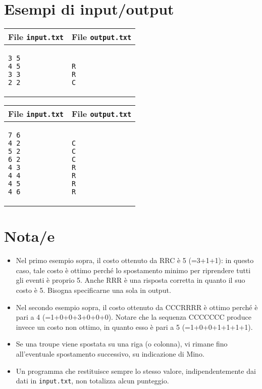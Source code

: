 \documentclass[a4paper,11pt]{article}
\begin{document}
\section*{Esempi di input/output}

  
    \noindent
    \begin{tabular}{p{11cm}|p{5cm}}
    \toprule
    \textbf{File \texttt{input.txt}}
    & \textbf{File \texttt{output.txt}}
    \\
    \midrule
    \scriptsize
    \begin{verbatim}
3 5
4 5 
3 3
2 2
\end{verbatim}
    &
    \scriptsize
    \begin{verbatim}

R
R
C
\end{verbatim}
    \\
    \bottomrule
    \end{tabular}
  
    \noindent
    \begin{tabular}{p{11cm}|p{5cm}}
    \toprule
    \textbf{File \texttt{input.txt}}
    & \textbf{File \texttt{output.txt}}
    \\
    \midrule
    \scriptsize
    \begin{verbatim}
7 6
4 2
5 2
6 2
4 3
4 4
4 5
4 6
\end{verbatim}
    &
    \scriptsize
    \begin{verbatim}

C
C
C
R
R
R
R
\end{verbatim}
    \\
    \bottomrule
    \end{tabular}
  
\section*{Nota/e}
\begin{itemize}
  
    \item 
Nel primo esempio sopra, il costo ottenuto da RRC è 5 (=3+1+1):
in questo caso, tale costo è ottimo perché lo
spostamento minimo per riprendere tutti gli eventi è proprio
5. Anche RRR è una risposta corretta in quanto il suo costo
è 5. Bisogna specificarne una sola in output.

    \item 
Nel secondo esempio sopra, il costo ottenuto da CCCRRRR è
ottimo perché è pari a 4 (=1+0+0+3+0+0+0). Notare che la
sequenza CCCCCCC produce invece un costo non ottimo, in quanto esso
è pari a 5 (=1+0+0+1+1+1+1).

    \item  Se una troupe viene spostata su una riga (o colonna), vi rimane
fino all'eventuale spostamento successivo, su indicazione di Mino.

    \item Un programma che restituisce sempre lo stesso valore,
indipendentemente dai dati in \texttt{input.txt}, non totalizza
alcun punteggio.
\end{itemize}
\end{document}
